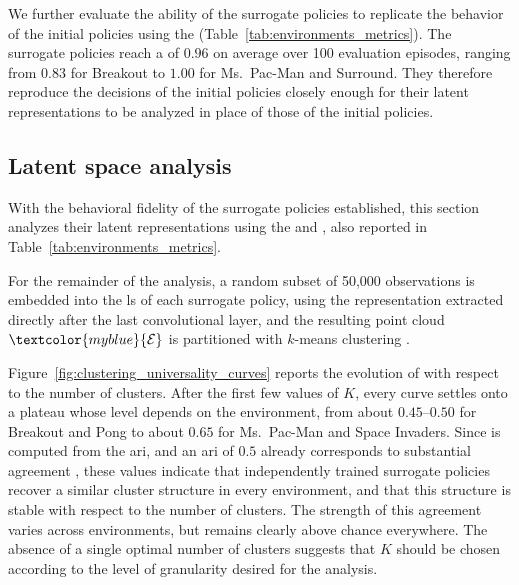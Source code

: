 We further evaluate the ability of the surrogate policies to replicate the behavior of the initial policies using the \BehaviorReconstructionName (Table~\ref{tab:environments_metrics}).
The surrogate policies reach a \BehaviorReconstructionName of $0.96$ on average over 100 evaluation episodes, ranging from $0.83$ for Breakout to $1.00$ for Ms.\ Pac-Man and Surround.
They therefore reproduce the decisions of the initial policies closely enough for their latent representations to be analyzed in place of those of the initial policies.



\subsection{Latent space analysis}
\label{ssec:experiments_latent_space_analysis}

With the behavioral fidelity of the surrogate policies established, this section analyzes their latent representations using the \AbstractionScoreName and \ClusteringUniversalityName, also reported in Table~\ref{tab:environments_metrics}.

For the remainder of the analysis, a random subset of 50,000 observations is embedded into the \gls{ls} of each surrogate policy, using the representation extracted directly after the last convolutional layer, and the resulting point cloud $\textcolor{myblue}{\mathcal{E}}$ is partitioned with $k$-means clustering \cite{macqueen1967multivariate}.



Figure~\ref{fig:clustering_universality_curves} reports the evolution of \ClusteringUniversalityName with respect to the number of clusters.
After the first few values of $K$, every curve settles onto a plateau whose level depends on the environment, from about $0.45$--$0.50$ for Breakout and Pong to about $0.65$ for Ms.\ Pac-Man and Space Invaders.
Since \ClusteringUniversalityName is computed from the \gls{ari}, and an \gls{ari} of $0.5$ already corresponds to substantial agreement \cite{amezquita2020orchestrating}, these values indicate that independently trained surrogate policies recover a similar cluster structure in every environment, and that this structure is stable with respect to the number of clusters.
The strength of this agreement varies across environments, but remains clearly above chance everywhere.
The absence of a single optimal number of clusters suggests that $K$ should be chosen according to the level of granularity desired for the analysis.

